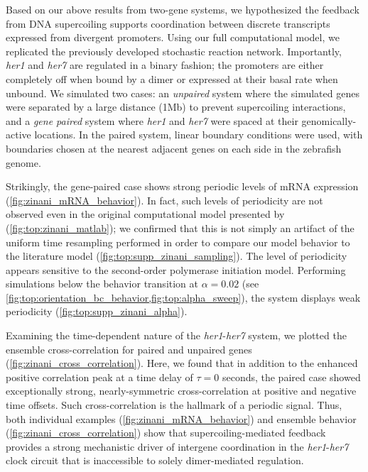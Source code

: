 \documentclass[11pt]{article}
\begin{document}
Based on our above results from two-gene systems, we hypothesized the feedback from DNA supercoiling supports coordination between discrete transcripts expressed from divergent promoters. Using our full computational model, we replicated the previously developed stochastic reaction network. Importantly, \textit{her1} and \textit{her7} are regulated in a binary fashion; the promoters are either completely off when bound by a dimer or expressed at their basal rate when unbound. We simulated two cases: an \emph{unpaired} system where the simulated genes were separated by a large distance (1Mb) to prevent supercoiling interactions, and a \emph{gene paired} system where \textit{her1} and \textit{her7} were spaced at their genomically-active locations. In the paired system, linear boundary conditions were used, with boundaries chosen at the nearest adjacent genes on each side in the zebrafish genome.

Strikingly, the gene-paired case shows strong periodic levels of mRNA expression (\cref{fig:zinani_mRNA_behavior}). In fact, such levels of periodicity are not observed even in the original computational model presented by \textcite{zinaniPairingSegmentationClock2021} (\cref{fig:top:zinani_matlab}); we confirmed that this is not simply an artifact of the uniform time resampling performed in order to compare our model behavior to the literature model (\cref{fig:top:supp_zinani_sampling}). The level of periodicity appears sensitive to the second-order polymerase initiation model. Performing simulations below the behavior transition at \(\alpha = 0.02\) (see \cref{fig:top:orientation_bc_behavior,fig:top:alpha_sweep}), the system displays weak periodicity (\cref{fig:top:supp_zinani_alpha}). 

Examining the time-dependent nature of the \textit{her1}-\textit{her7} system, we plotted the ensemble cross-correlation for paired and unpaired genes (\cref{fig:zinani_cross_correlation}). Here, we found that in addition to the enhanced positive correlation peak at a time delay of \(\tau = 0\) seconds, the paired case showed exceptionally strong, nearly-symmetric cross-correlation at positive and negative time offsets. Such cross-correlation is the hallmark of a periodic signal. Thus, both individual examples (\cref{fig:zinani_mRNA_behavior}) and ensemble behavior (\cref{fig:zinani_cross_correlation}) show that supercoiling-mediated feedback provides a strong mechanistic driver of intergene coordination in the \textit{her1}-\textit{her7} clock circuit that is inaccessible to solely dimer-mediated regulation.
\end{document}
